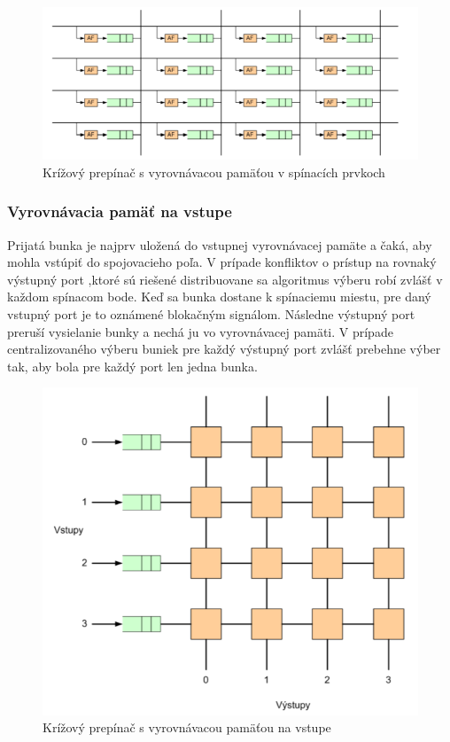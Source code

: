 \begin{figure}[ht]
\centering
  \begin{center}
    \includegraphics[scale=0.8]{images/kriz_prep_spin.png}
  \end{center}
  \caption[Krížový prepínač s vyrovnávacou pamäťou v spínacích prvkoch]{Krížový prepínač s vyrovnávacou pamäťou v spínacích prvkoch}
\end{figure}

\subsubsection{Vyrovnávacia pamäť na vstupe}
Prijatá bunka je najprv uložená do vstupnej vyrovnávacej pamäte a čaká, aby mohla vstúpiť do spojovacieho poľa. V prípade konfliktov o prístup na rovnaký výstupný port ,ktoré sú riešené distribuovane sa algoritmus výberu robí zvlášť v každom spínacom bode. Keď sa bunka dostane k spínaciemu miestu, pre daný vstupný port je to oznámené blokačným signálom. Následne výstupný port preruší vysielanie bunky a nechá ju vo vyrovnávacej pamäti. V prípade centralizovaného výberu buniek pre každý výstupný port zvlášť prebehne výber tak, aby bola pre každý port len jedna bunka.

\begin{figure}[ht]
\centering
  \begin{center}
    \includegraphics[scale=0.5]{images/kriz_prep_vstup.png}
  \end{center}
  \caption[Krížový prepínač s vyrovnávacou pamäťou na vstupe]{Krížový prepínač s vyrovnávacou pamäťou na vstupe}
\end{figure}


